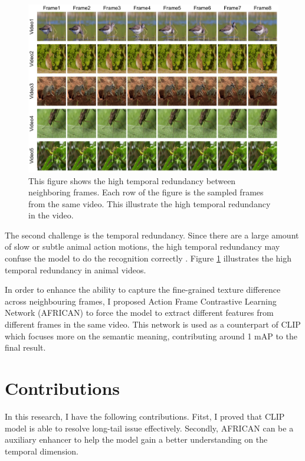 \begin{figure}[h]
    \centering
    \includegraphics[width=1\textwidth]{assets/imgs/1_2_FrameComparison}
    \caption[Temporal Redundancy]{This figure shows the high temporal redundancy between neighboring frames. Each row of the figure is the sampled frames from the same video. This illustrate the high temporal redundancy in the video.}
    \label{fig:1_2_FrameComparison}
\end{figure}

The second challenge is the temporal redundancy. Since there are a large amount of slow or subtle animal action motions, the high temporal redundancy may confuse the model to do the recognition correctly \parencite{YUAN2018221, li2022uniformer}. Figure \ref{fig:1_2_FrameComparison} illustrates the high temporal redundancy in animal videos. 

In order to enhance the ability to capture the fine-grained texture difference across neighbouring frames, I proposed Action Frame Contrastive Learning Network (AFRICAN) to force the model to extract different features from different frames in the same video. This network is used as a counterpart of CLIP which focuses more on the semantic meaning, contributing around 1 mAP to the final result.

\section{Contributions}
In this research, I have the following contributions. Fitst, I proved that CLIP model is able to resolve long-tail issue effectively. Secondly, AFRICAN can be a auxiliary enhancer to help the model gain a better understanding on the temporal dimension.


